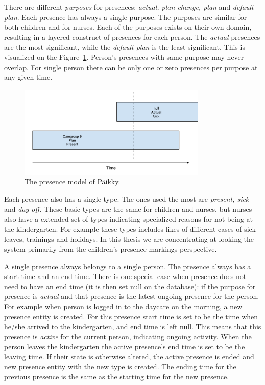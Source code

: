 There are different \textit{purposes} for presences: \textit{actual, plan change, plan} and \textit{default plan}. Each presence has always a single purpose. The purposes are similar for both children and for nurses. Each of the purposes exists on their own domain, resulting in a layered construct of presences for each person. The \textit{actual} presences are the most significant, while the \textit{default plan} is the least significant. This is visualized on the Figure~\ref{fig:presencemodel}. Person's presences with same purpose may never overlap. For single person there can be only one or zero presences per purpose at any given time.

\begin{figure}[t]
\begin{center}
\includegraphics[width=0.8\textwidth]{assets/presencemodel.png}
\end{center}
\caption{The presence model of Päikky.}
\label{fig:presencemodel}
\end{figure}


Each presence also has a single type. The ones used the most are \textit{present, sick} and \textit{day off.} These basic types are the same for children and nurses, but nurses also have a extended set of types indicating specialized reasons for not being at the kindergarten. For example these types includes likes of different cases of sick leaves, trainings and holidays. In this thesis we are concentrating at looking the system primarily from the children's presence markings perspective.

A single presence always belongs to a single person. The presence always has a start time and an end time. There is one special case when presence does not need to have an end time (it is then set null on the database): if the purpose for presence is \textit{actual} and that presence is the latest ongoing presence for the person. For example when person is logged in to the daycare on the morning, a new presence entity is created. For this presence start time is set to be the time when he/she arrived to the kindergarten, and end time is left null. This means that this presence is \textit{active} for the current person, indicating ongoing activity. When the person leaves the kindergarten the active presence's end time is set to be the leaving time. If their state is otherwise altered, the active presence is ended and new presence entity with the new type is created. The ending time for the previous presence is the same as the starting time for the new presence. 



